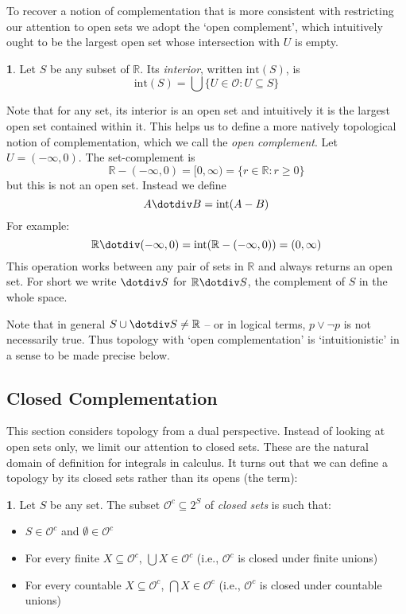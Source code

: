 \documentclass[oneside,english]{article}
\theoremstyle{plain}
\theoremstyle{definition}
\newtheorem{defn}[thm]{\protect\definitionname}
\theoremstyle{definition}
\providecommand{\definitionname}{Definition}
\begin{document}
To recover a notion of complementation that is more consistent with restricting our attention to open sets we adopt the `open complement', which intuitively ought to be the largest open set whose intersection with $U$ is empty. 
\begin{defn}
	Let $S$ be any subset of $\mathbb{R}$. Its \emph{interior}, written $\text{int}(S)$, is 
	\[
		\text{int}(S) = \bigcup \{U\in \mathscr{O} : U\subseteq S\}
	\]
\end{defn}
Note that for any set, its interior is an open set and intuitively it is the largest open set contained within it. This helps us to define a more natively topological notion of complementation, which we call the \emph{open complement}. Let $U = (-\infty, 0)$. The set-complement is
\[
	\mathbb{R}- (-\infty, 0) = [0, \infty) = \{r\in\mathbb{R}: r \ge 0\}
\]
but this is not an open set. Instead we define
\[
	A\dotdiv B = \text{int}(A- B)
\]
For example:
\[
	\mathbb{R}\dotdiv (-\infty, 0) = \text{int}(\mathbb{R}- (-\infty, 0)) = (0, \infty)
\]
This operation works between any pair of sets in $\mathbb{R}$ and always returns an open set. For short we write $\dotdiv S$ for $\mathbb{R}\dotdiv S$, the complement of $S$ in the whole space.

Note that in general $S\cup\dotdiv S\ne \mathbb{R}$ -- or in logical terms, $p\lor\lnot p$ is not necessarily true. Thus topology with `open complementation' is `intuitionistic' in a sense to be made precise below.

\subsection{Closed Complementation}

This section considers topology from a dual perspective. Instead of looking at open sets only, we limit our attention to closed sets. These are the natural domain of definition for integrals in calculus. It turns out that we can define a topology by its closed sets rather than its opens (the term):

\begin{defn}
	Let $S$ be any set. The subset $\mathscr{O}^c \subseteq 2^S$ of \emph{closed sets} is such that:
	\begin{itemize}
		\item $S\in\mathscr{O}^c$ and $\emptyset\in\mathscr{O}^c$
		\item For every finite $X\subseteq\mathscr{O}^c$, $\bigcup X\in \mathscr{O}^c$ (i.e., $\mathscr{O}^c$ is closed under finite unions)
		\item For every countable $X\subseteq\mathscr{O}^c$, $\bigcap X\in \mathscr{O}^c$ (i.e., $\mathscr{O}^c$ is closed under countable unions)
	\end{itemize}
\end{defn}
\end{document}
